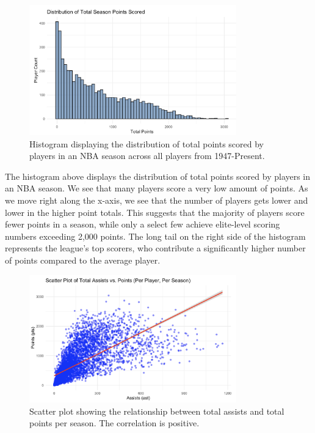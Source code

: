 \documentclass[12pt]{article}
\begin{document}
\begin{figure}[h]
    \centering
    \includegraphics[width=0.8\textwidth]{EDA_HISTOGRAM.png}
    \caption{Histogram displaying the distribution of total points scored by players in an NBA season across all players from 1947-Present.}
    \label{fig:points_distribution}
\end{figure}

The histogram above displays the distribution of total points scored by players in an NBA season. We see that many players score a very low amount of points. As we move right along the x-axis, we see that the number of players gets lower and lower in the higher point totals. This suggests that the majority of players score fewer points in a season, while only a select few achieve elite-level scoring numbers exceeding 2,000 points. The long tail on the right side of the histogram represents the league’s top scorers, who contribute a significantly higher number of points compared to the average player.

\begin{figure}[H]
    \centering
    \includegraphics[width=0.8\textwidth]{EDA_SCATTERPLOT.png}
    \caption{Scatter plot showing the relationship between total assists and total points per season. The correlation is positive.}
    \label{fig:assists_vs_points}
\end{figure}
\end{document}
